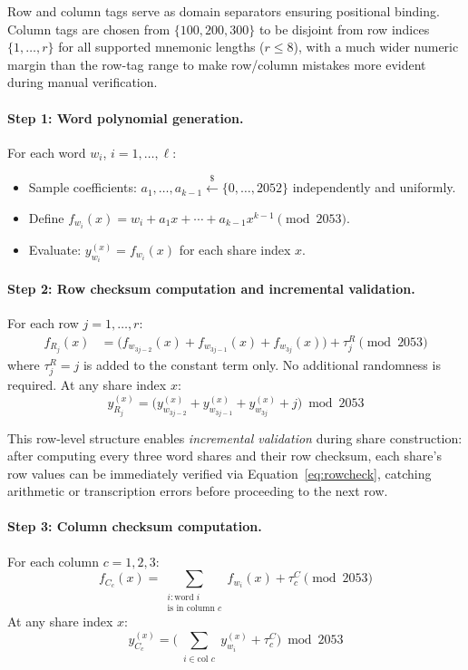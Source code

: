 \documentclass[11pt]{article}
\begin{document}
Row and column tags serve as domain separators ensuring positional binding. Column tags are chosen from $\{100, 200, 300\}$ to be disjoint from row indices $\{1, \ldots, r\}$ for all supported mnemonic lengths ($r \leq 8$), with a much wider numeric margin than the row-tag range to make row/column mistakes more evident during manual verification.

\paragraph{Step 1: Word polynomial generation.} For each word $w_i$, $i = 1, \ldots, \ell$:
\begin{itemize}[noitemsep]
    \item Sample coefficients: $a_1, \ldots, a_{k-1} \xleftarrow{\$} \{0, \ldots, 2052\}$ independently and uniformly.
    \item Define $f_{w_i}(x) = w_i + a_1 x + \cdots + a_{k-1} x^{k-1} \pmod{2053}$.
    \item Evaluate: $y_{w_i}^{(x)} = f_{w_i}(x)$ for each share index $x$.
\end{itemize}

\paragraph{Step 2: Row checksum computation and incremental validation.} For each row $j = 1, \ldots, r$:
\begin{align}
    f_{R_j}(x) &= \bigl(f_{w_{3j-2}}(x) + f_{w_{3j-1}}(x) + f_{w_{3j}}(x)\bigr) + \tau^R_j \pmod{2053} \label{eq:rowpoly}
\end{align}
where $\tau^R_j = j$ is added to the constant term only. No additional randomness is required. At any share index $x$:
\begin{equation}
    y_{R_j}^{(x)} = \bigl(y_{w_{3j-2}}^{(x)} + y_{w_{3j-1}}^{(x)} + y_{w_{3j}}^{(x)} + j\bigr) \bmod 2053 \label{eq:rowcheck}
\end{equation}

This row-level structure enables \emph{incremental validation} during share construction: after computing every three word shares and their row checksum, each share's row values can be immediately verified via Equation~\eqref{eq:rowcheck}, catching arithmetic or transcription errors before proceeding to the next row.

\paragraph{Step 3: Column checksum computation.} For each column $c = 1, 2, 3$:
\begin{equation}
    f_{C_c}(x) = \sum_{\substack{i : \text{word } i \\ \text{is in column } c}} f_{w_i}(x) + \tau^C_c \pmod{2053} \label{eq:colpoly}
\end{equation}
At any share index $x$:
\begin{equation}
    y_{C_c}^{(x)} = \biggl(\sum_{\substack{i \in \text{col } c}} y_{w_i}^{(x)} + \tau^C_c\biggr) \bmod 2053 \label{eq:colcheck}
\end{equation}
\end{document}
